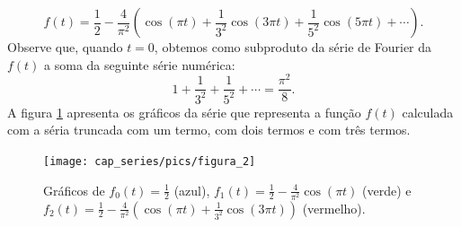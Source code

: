 \begin{ex}
\begin{equation}
f(t)=\frac{1}{2}-\frac{4}{\pi^2}\left(\cos(\pi t)+\frac{1}{3^2}\cos(3\pi t)+\frac{1}{5^2}\cos(5\pi t) + \cdots\right).
\end{equation}
Observe que, quando $t=0$, obtemos como subproduto da série de Fourier da $f(t)$ a soma da seguinte série numérica:
\begin{equation}\label{serie_inv_impar}
1+\frac{1}{3^2}+\frac{1}{5^2}+\cdots=\frac{\pi^2}{8}.
\end{equation}
A figura \ref{fig_conv_triangular} apresenta os gráficos da série que representa a função $f(t)$ calculada com a séria truncada com um termo, com dois termos e com três termos.
\begin{figure}[!ht]
\begin{center}
\texttt{[image: cap\_series/pics/figura\_2]}\end{center}
\caption{\label{fig_conv_triangular}Gráficos de $f_0(t)=\frac{1}{2}$ (azul), $f_1(t)=\frac{1}{2}-\frac{4}{\pi^2}\cos(\pi t)$ (verde) e $f_2(t)=\frac{1}{2}-\frac{4}{\pi^2}\left(\cos(\pi t)+\frac{1}{3^2}\cos(3\pi t)\right)$ (vermelho).}
\end{figure}
\end{ex}
